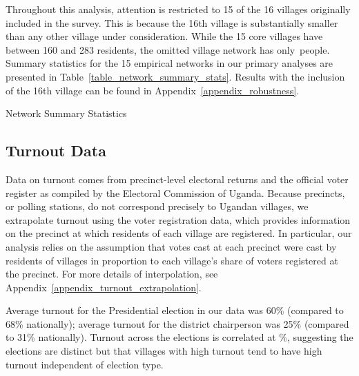 \documentclass[12pt]{article}
\begin{document}
Throughout this analysis, attention is restricted to 15 of the 16 villages originally included in the survey. This is because the 16th village is substantially smaller than any other village under consideration. While the 15 core villages have between 160 and 283 residents, the omitted village network has only~people. Summary statistics for the 15 empirical networks in our primary analyses are presented in Table~\ref{table_network_summary_stats}. Results with the inclusion of the 16th village can be found in Appendix~\ref{appendix_robustness}.

\begin{table}
\centering
\caption{Network Summary Statistics}\label{table_network_summary_stats}

\end{table}


\subsection{Turnout Data}\label{section_data_turnout}

Data on turnout comes from precinct-level electoral returns and the official voter register as compiled by the Electoral Commission of Uganda. Because precincts, or polling stations, do not correspond precisely to Ugandan villages, we extrapolate turnout using the voter registration data, which provides information on the precinct at which residents of each village are registered. In particular, our analysis relies on the assumption that votes cast at each precinct were cast by residents of villages in proportion to each village's share of voters registered at the precinct.  For more details of interpolation, see Appendix~\ref{appendix_turnout_extrapolation}.




Average turnout for the Presidential election in our data was 60\% (compared to 68\% nationally); average turnout for the district chairperson was 25\% (compared to 31\% nationally). Turnout across the elections is correlated at \unskip\%, suggesting the elections are distinct but that villages with high turnout tend to have high turnout independent of election type.
\iffalse
\begin{samepage}
\begin{figure}[t]
	\begin{center}
	    \caption{Presidential \& LC5 Turnout}\label{turnout_hist}
    		\texttt{[image: ../3\_results/summary\_turnout.pdf]}
   \end{center}
\end{figure}
\end{samepage}
\fi
%
\end{document}
